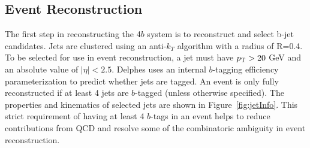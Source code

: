 \subsection{Event Reconstruction}
\label{sec:eventReco}
The first step in reconstructing the 4$b$ system is to reconstruct and select b-jet candidates. Jets are clustered using an anti-$k_T$ algorithm with a radius of R=0.4. To be selected for use in event reconstruction, a jet must have $p_{\text{T}} > 20$ GeV and an absolute value of $\mid\eta\mid < 2.5$. Delphes uses an internal $b$-tagging efficiency parameterization to predict whether jets are tagged. An event is only fully reconstructed if at least 4 jets are $b$-tagged (unless otherwise specified). The properties and kinematics of selected jets are shown in Figure~\ref{fig:jetInfo}. This strict requirement of having at least 4 $b$-tags in an event helps to reduce contributions from QCD and resolve some of the combinatoric ambiguity in event reconstruction.

